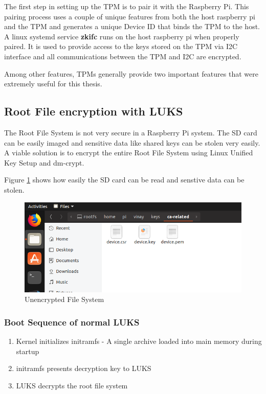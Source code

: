 \documentclass[11pt,openright]{report}
\begin{document}
The first step in setting up the TPM is to pair \cite{TPMSetup} it with the Raspberry Pi. This pairing process uses a couple of unique features from both the host raspberry pi and the TPM and generates a unique Device ID that binds the TPM to the host. A linux systemd service \textbf{zkifc} runs on the host raspberry pi when properly paired. It is used to provide access to the keys stored on the TPM via I2C interface and all communications between the TPM and I2C are encrypted.

Among other features, TPMs generally provide two important features that were extremely useful for this thesis.
\subsection{Root File encryption with LUKS}
The Root File System is not very secure in a Raspberry Pi system. The SD card can be easily imaged and sensitive data like shared keys can be stolen very easily. A viable solution is to encrypt the entire Root File System using Linux Unified Key Setup and dm-crypt.

Figure \ref{fig:normal_fs} shows how easily the SD card can be read and senstive data can be stolen.

\begin{figure}
	\centering
	\includegraphics[scale=1]{images/3_NormalFS.png}
	\caption{Unencrypted File System}
	\label{fig:normal_fs}
\end{figure}

\subsubsection{Boot Sequence of normal LUKS}
\begin{enumerate}
	\item Kernel initializes initramfs - A single archive loaded into main memory during startup
	\item initramfs presents decryption key to LUKS
	\item LUKS decrypts the root file system
\end{enumerate}
\end{document}
